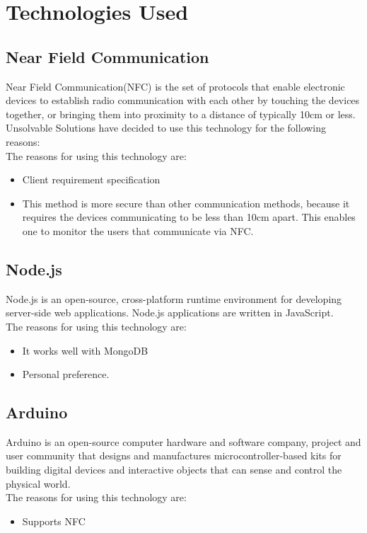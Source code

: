 
\section{Technologies Used}

\subsection{Near Field Communication}
Near Field Communication(NFC) is the set of protocols that enable electronic devices to establish radio communication with each other by touching the devices together, or bringing them into proximity to a distance of typically 10cm or less.
Unsolvable Solutions have decided to use this technology for the following reasons:
\\The reasons for using this technology are:
\begin{itemize}
\item Client requirement specification
\item This method is more secure than other communication methods, because it requires the devices communicating to be less than 10cm apart. This enables one to monitor the users that communicate via NFC.
\end{itemize}


\subsection{ Node.js}
Node.js is an open-source, cross-platform runtime environment for developing server-side web applications. Node.js applications are written in JavaScript. 
\\The reasons for using this technology are:
\begin{itemize}
\item It works well with MongoDB
\item Personal preference.
\end{itemize}

\subsection{ Arduino}Arduino is an open-source computer hardware and software company, project and user community that designs and manufactures microcontroller-based kits for building digital devices and interactive objects that can sense and control the physical world.
\\The reasons for using this technology are:
\begin{itemize}
\item Supports NFC
\end{itemize}

